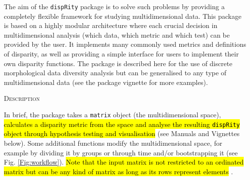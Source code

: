 \documentclass[12pt,letterpaper]{article}
\renewcommand{\section}[1]{%
\bigskip
\begin{center}
\begin{Large}
\normalfont\scshape #1
\medskip
\end{Large}
\end{center}}
\newcommand{\disp}{\texttt{dispRity} }
\begin{document}
The aim of the \disp package is to solve such problems by providing a completely flexible framework for studying multidimensional data.
This package is based on a highly modular architecture where each crucial decision in multidimensional analysis (which data, which metric and which test) can be provided by the user.
It implements many commonly used metrics and definitions of disparity, as well as providing a simple interface for users to implement their own disparity functions.
The package is described here for the use of discrete morphological data diversity analysis but can be generalised to any type of multidimensional data (see the package vignette for more examples).

\section{Description}
In brief, the package takes a \texttt{matrix} object (the multidimensional space), 
\hl{calculates a disparity metric from the space and analyse the resulting \texttt{dispRity} object through hypothesis testing and visualisation}
(see Manuals and Vignettes below).
Some additional functions modify the multidimensional space, for example by dividing it by groups or through time and/or bootstrapping it (see Fig. \ref{Fig:workflow}).%
\hl{Note that the input matrix is not restricted to an ordinated matrix but can be any kind of matrix as long as its rows represent elements} \citep[e.g. the multidimensional space can be a distance matrix][]{Close2015}.
\end{document}
